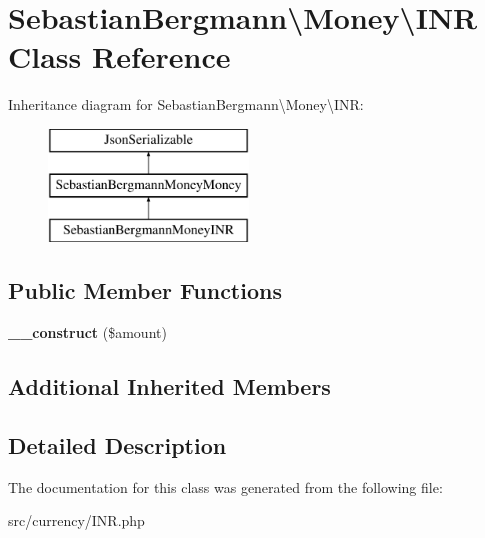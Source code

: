\hypertarget{classSebastianBergmann_1_1Money_1_1INR}{}\section{Sebastian\+Bergmann\textbackslash{}Money\textbackslash{}I\+N\+R Class Reference}
\label{classSebastianBergmann_1_1Money_1_1INR}
Inheritance diagram for Sebastian\+Bergmann\textbackslash{}Money\textbackslash{}I\+N\+R\+:\begin{figure}[H]
\begin{center}
\leavevmode
\includegraphics[height=3.000000cm]{classSebastianBergmann_1_1Money_1_1INR}
\end{center}
\end{figure}
\subsection*{Public Member Functions}
\begin{DoxyCompactItemize}
\item 
\hypertarget{classSebastianBergmann_1_1Money_1_1INR_a93168f406af4768195ec59c6e82fd6f3}{}{\bfseries \+\_\+\+\_\+construct} (\$amount)\label{classSebastianBergmann_1_1Money_1_1INR_a93168f406af4768195ec59c6e82fd6f3}

\end{DoxyCompactItemize}
\subsection*{Additional Inherited Members}


\subsection{Detailed Description}


The documentation for this class was generated from the following file\+:\begin{DoxyCompactItemize}
\item 
src/currency/I\+N\+R.\+php\end{DoxyCompactItemize}
